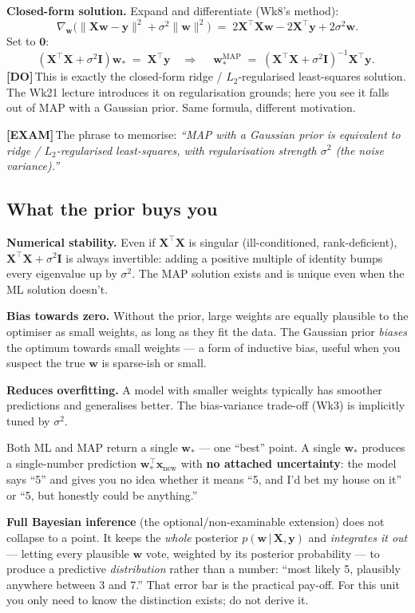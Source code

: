 \documentclass[11pt, a4paper]{article}
\newcommand{\examflag}{\textcolor{tipBd}{\textbf{[EXAM]}}\,}
\newcommand{\doflag}{\textcolor{defBd}{\textbf{[DO]}}\,}
\begin{document}
\textbf{Closed-form solution.} Expand and differentiate (Wk8's method):
\[
\nabla_\mathbf{w}\big(\|\mathbf{X}\mathbf{w}-\mathbf{y}\|^2 + \sigma^2\|\mathbf{w}\|^2\big) \;=\; 2\mathbf{X}^\top\mathbf{X}\mathbf{w} - 2\mathbf{X}^\top\mathbf{y} + 2\sigma^2\mathbf{w}.
\]
Set to $\mathbf{0}$:
\[
(\mathbf{X}^\top\mathbf{X} + \sigma^2\mathbf{I})\mathbf{w}_* \;=\; \mathbf{X}^\top\mathbf{y}
\quad\Longrightarrow\quad
\boxed{\;\mathbf{w}_*^{\text{MAP}} \;=\; (\mathbf{X}^\top\mathbf{X} + \sigma^2\mathbf{I})^{-1}\mathbf{X}^\top\mathbf{y}.\;}
\]
\doflag{}This is exactly the closed-form ridge / $L_2$-regularised least-squares solution. The Wk21 lecture introduces it on regularisation grounds; here you see it falls out of MAP with a Gaussian prior. Same formula, different motivation.

\examflag{}The phrase to memorise: \emph{``MAP with a Gaussian prior is equivalent to ridge / $L_2$-regularised least-squares, with regularisation strength $\sigma^2$ (the noise variance).''}

\subsection{What the prior buys you}

\textbf{Numerical stability.} Even if $\mathbf{X}^\top\mathbf{X}$ is singular (ill-conditioned, rank-deficient), $\mathbf{X}^\top\mathbf{X} + \sigma^2\mathbf{I}$ is always invertible: adding a positive multiple of identity bumps every eigenvalue up by $\sigma^2$. The MAP solution exists and is unique even when the ML solution doesn't.

\textbf{Bias towards zero.} Without the prior, large weights are equally plausible to the optimiser as small weights, as long as they fit the data. The Gaussian prior \emph{biases} the optimum towards small weights — a form of inductive bias, useful when you suspect the true $\mathbf{w}$ is sparse-ish or small.

\textbf{Reduces overfitting.} A model with smaller weights typically has smoother predictions and generalises better. The bias-variance trade-off (Wk3) is implicitly tuned by $\sigma^2$.

\begin{pitfallbox}
Both ML and MAP return a single $\mathbf{w}_*$ --- one ``best'' point. A single $\mathbf{w}_*$ produces a single-number prediction $\mathbf{w}_*^\top\mathbf{x}_{\text{new}}$ with \textbf{no attached uncertainty}: the model says ``5'' and gives you no idea whether it means ``5, and I'd bet my house on it'' or ``5, but honestly could be anything.''

\textbf{Full Bayesian inference} (the optional/non-examinable extension) does not collapse to a point. It keeps the \emph{whole} posterior $p(\mathbf{w}\,|\,\mathbf{X},\mathbf{y})$ and \emph{integrates it out} --- letting every plausible $\mathbf{w}$ vote, weighted by its posterior probability --- to produce a predictive \emph{distribution} rather than a number: ``most likely 5, plausibly anywhere between 3 and 7.'' That error bar is the practical pay-off. For this unit you only need to know the distinction exists; do not derive it.
\end{pitfallbox}
\end{document}
